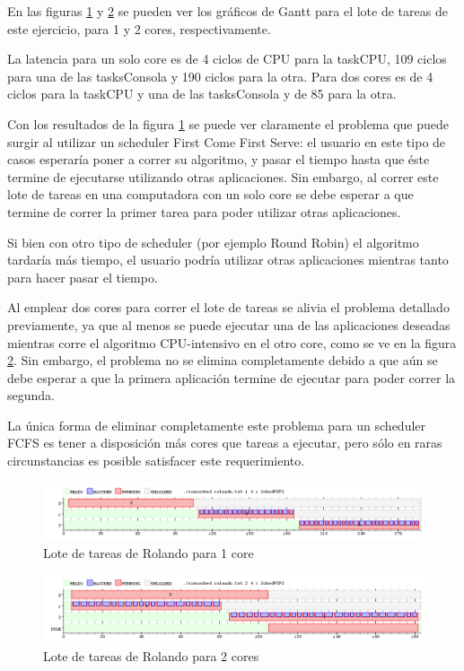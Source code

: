 
En las figuras \ref{fig:ej2-1core} y \ref{fig:ej2-2core} se pueden ver los gr\'aficos de Gantt para el lote de tareas de este ejercicio, para 1 y 2 cores, respectivamente.

La latencia para un solo core es de 4 ciclos de CPU para la taskCPU, 109 ciclos para una de las tasksConsola y 190 ciclos para la otra.
Para dos cores es de 4 ciclos para la taskCPU y una de las tasksConsola y de 85 para la otra.

Con los resultados de la figura \ref{fig:ej2-1core} se puede ver claramente el problema que puede surgir al utilizar un scheduler First Come First Serve: el usuario en este tipo de casos esperar\'ia poner a correr su algoritmo, y pasar el tiempo hasta que \'este termine de ejecutarse utilizando otras aplicaciones. 
Sin embargo, al correr este lote de tareas en una computadora con un solo core se debe esperar a que termine de correr la primer tarea para poder utilizar otras aplicaciones. 

Si bien con otro tipo de scheduler (por ejemplo Round Robin) el algoritmo tardar\'ia m\'as tiempo, el usuario podr\'ia utilizar otras aplicaciones mientras tanto para hacer pasar el tiempo.

Al emplear dos cores para correr el lote de tareas se alivia el problema detallado previamente, ya que al menos se puede ejecutar una de las aplicaciones deseadas mientras corre el algoritmo CPU-intensivo en el otro core, como se ve en la figura \ref{fig:ej2-2core}.
Sin embargo, el problema no se elimina completamente debido a que a\'un se debe esperar a que la primera aplicaci\'on termine de ejecutar para poder correr la segunda.

La \'unica forma de eliminar completamente este problema para un scheduler FCFS es tener a disposici\'on m\'as cores que tareas a ejecutar, pero s\'olo en raras circunstancias es posible satisfacer este requerimiento.

\begin{figure}[H]
\caption{Lote de tareas de Rolando para 1 core}
\label{fig:ej2-1core}
\includegraphics[width=1\textwidth]{imgs/ej2-1core}
\end{figure}

\begin{figure}[H]
\caption{Lote de tareas de Rolando para 2 cores}
\label{fig:ej2-2core}
\includegraphics[width=1\textwidth]{imgs/ej2-2core}
\end{figure}

